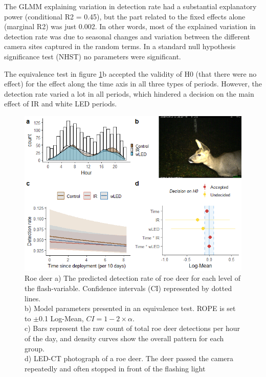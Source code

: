 \begin{table}[ht]
The GLMM explaining variation in detection rate had a substantial explanatory power (conditional R2 = 0.45), but the part related to the fixed effects alone (marginal R2) was just 0.002.
In other words, most of the explained variation in detection rate was due to seasonal changes and variation between the different camera sites captured in the random terms.
In a standard null hypothesis significance test (NHST) no parameters were significant.

The equivalence test in figure \ref{fig:raadyr}b accepted the validity of H0 (that there were no effect) for the effect along the time axis in all three types of periods.
However, the detection rate varied a lot in all periods, which hindered a decision on the main effect of IR and white LED periods. 


\begin{figure}
\centering
	\includegraphics[scale=.9]{../R/glmm_sp_files/figure-html/parameters-1.png}
\caption[Roe deer]
{Roe deer %
 a) The predicted detection rate of roe deer for each level of the flash-variable. Confidence intervals (CI) represented by dotted lines.\\
b) Model parameters presented in an equivalence test. ROPE is set to $\pm$0.1 Log-Mean, $CI =1 - 2\times \alpha$.\\ 
c) Bars represent the raw count of total roe deer detections per hour of the day, and density curves show the overall pattern for each group.\\
d) LED-CT photograph of a roe deer. The deer passed the camera repeatedly and often stopped in front of the flashing light}\label{fig:raadyr}
\end{figure}



\end{table}
